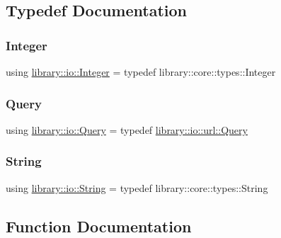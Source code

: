 \subsection{Typedef Documentation}
\mbox{\label{namespacelibrary_1_1io_a0a929bf9e177597c2e92073d200dda53}} 
\subsubsection{\texorpdfstring{Integer}{Integer}}
{\footnotesize\ttfamily using \hyperlink{namespacelibrary_1_1io_a0a929bf9e177597c2e92073d200dda53}{library\+::io\+::\+Integer} = typedef library\+::core\+::types\+::\+Integer}

\mbox{\label{namespacelibrary_1_1io_a39ebaf2265de78ba79eb5347f2af61b3}} 
\subsubsection{\texorpdfstring{Query}{Query}}
{\footnotesize\ttfamily using \hyperlink{namespacelibrary_1_1io_a39ebaf2265de78ba79eb5347f2af61b3}{library\+::io\+::\+Query} = typedef \hyperlink{classlibrary_1_1io_1_1url_1_1_query}{library\+::io\+::url\+::\+Query}}

\mbox{\label{namespacelibrary_1_1io_a7469b45835a4421045db344d6a5a1f85}} 
\subsubsection{\texorpdfstring{String}{String}}
{\footnotesize\ttfamily using \hyperlink{namespacelibrary_1_1io_a7469b45835a4421045db344d6a5a1f85}{library\+::io\+::\+String} = typedef library\+::core\+::types\+::\+String}



\subsection{Function Documentation}
\mbox{\label{namespacelibrary_1_1io_a36e00c0130e6908cc64fe2f7941f2652}} 
